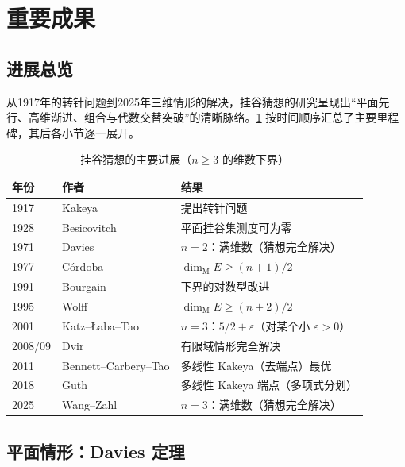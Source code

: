 \section{重要成果}\label{sec:results}

\subsection{进展总览}

从1917年的转针问题到2025年三维情形的解决，挂谷猜想的研究呈现出“平面先行、高维渐进、组合与代数交替突破”的清晰脉络。\cref{tab:progress} 按时间顺序汇总了主要里程碑，其后各小节逐一展开。

\begin{table}[htbp]
    \centering
    \caption{挂谷猜想的主要进展（$n \ge 3$ 的维数下界）}
    \label{tab:progress}
    \begin{tabular}{lll}
        \toprule
        年份 & 作者 & 结果 \\
        \midrule
        1917 & Kakeya & 提出转针问题\cite{kakeya1917} \\
        1928 & Besicovitch & 平面挂谷集测度可为零\cite{besicovitch1928} \\
        1971 & Davies & $n = 2$：满维数（猜想完全解决）\cite{davies1971} \\
        1977 & Córdoba & $\dim_{\mathrm{M}} E \ge (n+1)/2$\cite{cordoba1977} \\
        1991 & Bourgain & 下界的对数型改进\cite{bourgain1991} \\
        1995 & Wolff & $\dim_{\mathrm{M}} E \ge (n+2)/2$\cite{wolff1995} \\
        2001 & Katz--\L aba--Tao & $n = 3$：$5/2 + \varepsilon$（对某个小 $\varepsilon > 0$）\cite{klt2001} \\
        2008/09 & Dvir & 有限域情形完全解决\cite{dvir2009} \\
        2011 & Bennett--Carbery--Tao & 多线性 Kakeya（去端点）最优\cite{bct2011} \\
        2018 & Guth & 多线性 Kakeya 端点（多项式分划）\cite{guth2018} \\
        2025 & Wang--Zahl & $n = 3$：满维数（猜想完全解决）\cite{wangzahl2025} \\
        \bottomrule
    \end{tabular}
\end{table}

\subsection{平面情形：Davies 定理}


